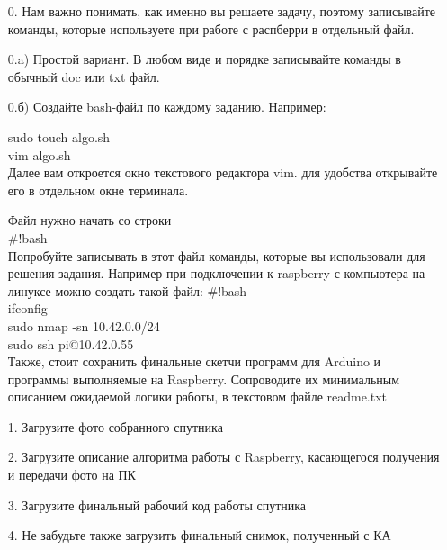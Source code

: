 \begin{enumerate}
    \item[0.] Нам важно понимать, как именно вы решаете задачу, поэтому записывайте команды, которые используете при работе с распберри в отдельный файл.
    \item[0.a)] Простой вариант. В любом виде и порядке записывайте команды в обычный doc или txt файл. 
    \item[0.б)] Создайте bash-файл по каждому заданию. Например:
    
    sudo touch algo.sh\\
    vim algo.sh \\
    Далее вам откроется окно текстового редактора vim. для удобства открывайте его в отдельном окне терминала. 
    
    Файл нужно начать со строки \\
    \#!bash \\
    Попробуйте записывать в этот файл команды, которые вы использовали для решения задания. Например при подключении к raspberry с компьютера на линуксе можно создать такой файл:  
    \#!bash\\ 
    ifconfig    \\
    sudo nmap -sn 10.42.0.0/24\\
    sudo ssh pi@10.42.0.55\\
    Также, стоит сохранить финальные скетчи программ для Arduino и программы выполняемые на Raspberry. Сопроводите их минимальным описанием ожидаемой логики работы, в текстовом файле readme.txt
    \item[1.] Загрузите фото собранного спутника
    \item[2.] Загрузите описание алгоритма работы с Raspberry, касающегося получения и передачи фото на ПК
    \item[3.] Загрузите финальный рабочий код работы спутника 
    \item[4.] Не забудьте также загрузить финальный снимок, полученный с КА
\end{enumerate} 

\markSection

